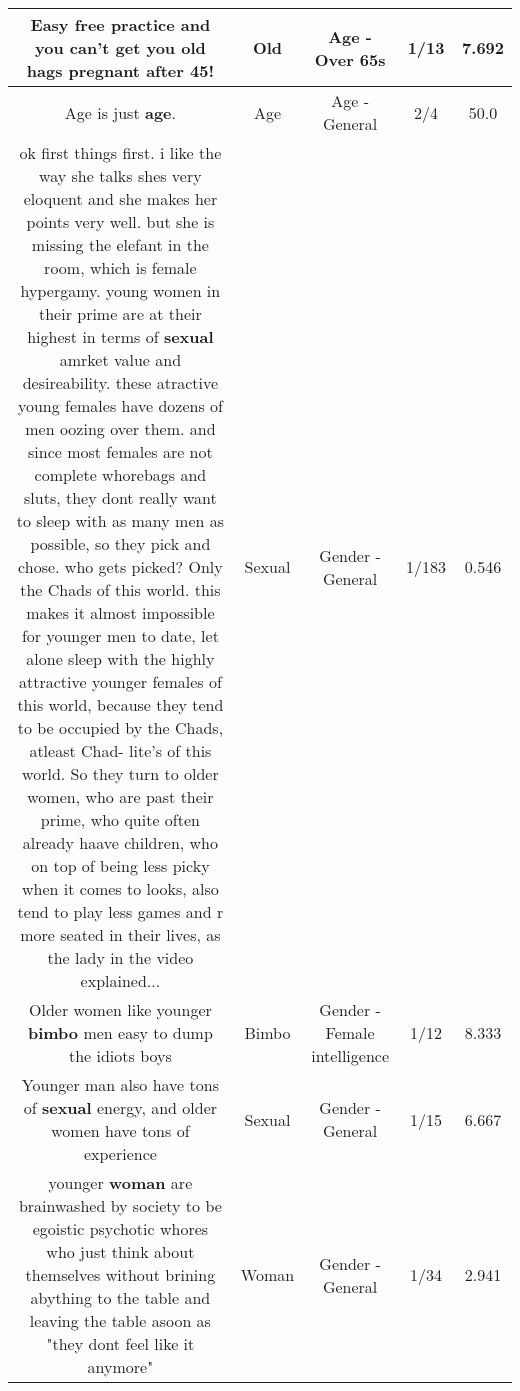 \documentclass[11pt]{article}
\newlength\mylength
\begin{document}
\begin{center}
\begin{longtable}{|C{.65\mylength}|C{.30\mylength}|C{.12\mylength}|C{.12\mylength}|C{.12\mylength}|}
  \small Easy free practice and you can't get you \textbf{old} hags pregnant after 45!\normalsize   & Old & Age - Over 65s & 1/13 & 7.692 \\  \hline
  \small Age is just \textbf{age}.\normalsize   & Age & Age - General & 2/4 & 50.0 \\  \hline
  \small ok first things first. i like the way she talks shes very eloquent and she makes her points very well. but she is missing the elefant in the room, which is female hypergamy. young women in their prime are at their highest in terms of \textbf{sexual} amrket value and desireability. these atractive young females have dozens of men oozing over them.  and since most females are not complete whorebags and sluts, they dont really want to sleep with as many men as possible, so they pick and chose. who gets picked? Only the Chads of this world. this makes it almost impossible for younger men to  date, let alone sleep with the highly attractive younger females of this world, because they tend to be occupied by the Chads, atleast  Chad- lite's of this world. So they turn to older women, who are past their prime, who quite often already haave children, who on top of being less picky when it comes to looks, also tend to play less games and r more seated in their lives, as the lady in the video explained...\normalsize   & Sexual & Gender - General & 1/183 & 0.546 \\  \hline
  \small Older women like younger \textbf{bimbo} men easy to dump the idiots boys\normalsize   & Bimbo & Gender - Female intelligence & 1/12 & 8.333 \\  \hline
  \small Younger man also have tons of \textbf{sexual} energy, and older women have tons of experience\normalsize   & Sexual & Gender - General & 1/15 & 6.667 \\  \hline
  \small younger \textbf{woman} are brainwashed by society to be egoistic psychotic whores who just think about themselves without brining abything to the table and leaving the table asoon as "they dont feel like it anymore"\normalsize   & Woman & Gender - General & 1/34 & 2.941 \\  \hline

\end{longtable}
\end{center}
\end{document}
